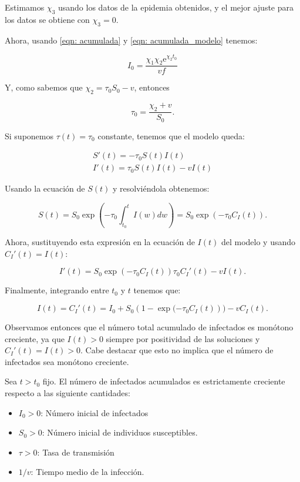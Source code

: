 Estimamos $\chi_3$ usando los datos de la epidemia obtenidos, y el mejor ajuste para los datos se obtiene con $\chi_3=0$.

Ahora, usando \eqref{eqn: acumulada} y \eqref{eqn: acumulada_modelo} tenemos:

\begin{equation}
I_0=\frac{\chi_1\chi_2\mathrm{e}^{\chi_2 t_0}}{vf}
\end{equation}

Y, como sabemos que $\chi_2 = \tau_0 S_0-v$, entonces

\begin{equation}
\tau_0 = \frac{\chi_2+v}{S_0}.
\end{equation}

Si suponemos $\tau (t) = \tau_0$ constante, tenemos que el modelo queda:

\begin{equation}
\begin{aligned}
S'(t) = -\tau_0S(t)I(t) \\
I'(t) = \tau_0S(t)I(t) -vI(t)
\end{aligned}
\end{equation}

Usando la ecuación de $S(t)$ y resolviéndola obtenemos:

$$S(t) = S_0\exp{\left( -\tau_0 \int_{t_0}^t I(w) dw \right)} = S_0\exp{(-\tau_0 C_I(t))}.$$

Ahora, sustituyendo esta expresión en la ecuación de $I(t)$ del modelo y usando $C_I'(t)=I(t)$:

$$I'(t) = S_0\exp{\left( -\tau_0 C_I(t)\right) }\tau_0 C_I'(t)-vI(t).$$

Finalmente, integrando entre $t_0$ y $t$ tenemos que:

$$I(t)=C_I'(t)=I_0+S_0(1-\exp{(-\tau_0 C_I(t)}))-vC_I(t).$$
 
Observamos entonces que el número total acumulado de infectados es monótono creciente, ya que $I(t)>0$ siempre por positividad de las soluciones y $C_I'(t)=I(t)>0$. Cabe destacar que esto no implica que el número de infectados sea monótono creciente.

\begin{theorem}
Sea $t>t_0$ fijo. El número de infectados acumulados es estrictamente creciente respecto a las siguiente cantidades:
\begin{itemize}
\item $I_0>0$: Número inicial de infectados
\item $S_0>0$: Número inicial de individuos susceptibles.
\item $\tau>0$: Tasa de transmisión
\item $1/v$: Tiempo medio de la infección.
\end{itemize}
\end{theorem}

